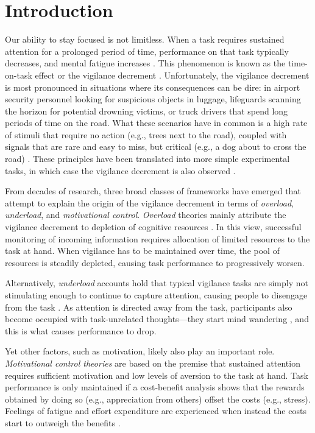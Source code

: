 \documentclass[11pt,]{memoir}
\begin{document}
\hypertarget{MFBrain-introduction}{%
\section{Introduction}\label{MFBrain-introduction}}

Our ability to stay focused is not limitless. When a task requires sustained attention for a prolonged period of time, performance on that task typically decreases, and mental fatigue increases \autocite{Ackerman2011}. This phenomenon is known as the time-on-task effect or the vigilance decrement \autocite{Warm2008}. Unfortunately, the vigilance decrement is most pronounced in situations where its consequences can be dire: in airport security personnel looking for suspicious objects in luggage, lifeguards scanning the horizon for potential drowning victims, or truck drivers that spend long periods of time on the road. What these scenarios have in common is a high rate of stimuli that require no action (e.g., trees next to the road), coupled with signals that are rare and easy to miss, but critical (e.g., a dog about to cross the road) \autocite{Parasuraman1979}. These principles have been translated into more simple experimental tasks, in which case the vigilance decrement is also observed \autocites{Bartlett1943}{Mackworth1948}.

From decades of research, three broad classes of frameworks have emerged that attempt to explain the origin of the vigilance decrement in terms of \emph{overload}, \emph{underload}, and \emph{motivational control}. \emph{Overload} theories mainly attribute the vigilance decrement to depletion of cognitive resources \autocite{Helton2008}. In this view, successful monitoring of incoming information requires allocation of limited resources to the task at hand. When vigilance has to be maintained over time, the pool of resources is steadily depleted, causing task performance to progressively worsen.

Alternatively, \emph{underload} accounts hold that typical vigilance tasks are simply not stimulating enough to continue to capture attention, causing people to disengage from the task \autocites{Manly1999}{Robertson1997}. As attention is directed away from the task, participants also become occupied with task-unrelated thoughts---they start mind wandering \autocite{Smallwood2006}, and this is what causes performance to drop.

Yet other factors, such as motivation, likely also play an important role. \emph{Motivational control theories} \autocite{Hockey1997} are based on the premise that sustained attention requires sufficient motivation and low levels of aversion to the task at hand. Task performance is only maintained if a cost-benefit analysis shows that the rewards obtained by doing so (e.g., appreciation from others) offset the costs (e.g., stress). Feelings of fatigue and effort expenditure are experienced when instead the costs start to outweigh the benefits \autocite{Kurzban2013}.
\end{document}
